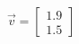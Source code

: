 \documentclass[preview]{standalone}
\begin{document}
\begin{align*}
\vec{v}=\begin{bmatrix}1.9\\1.5\end{bmatrix}
\end{align*}
\end{document}
